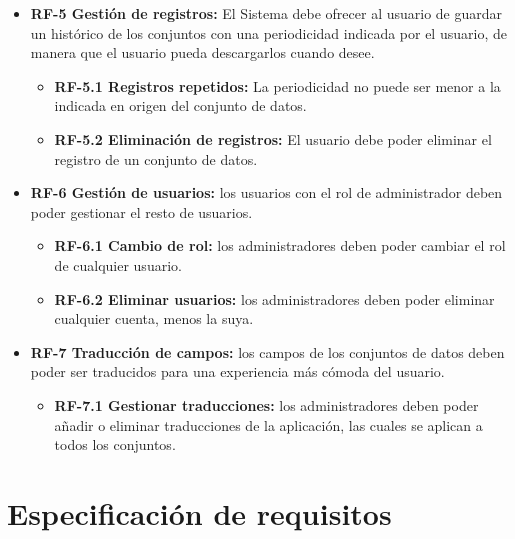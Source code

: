 \begin{itemize}
    \item \textbf{RF-5 Gestión de registros:} El Sistema debe ofrecer al usuario de guardar un histórico de los conjuntos con una periodicidad indicada por el usuario, de manera que el usuario pueda descargarlos cuando desee.
    \begin{itemize}
        \item \textbf{RF-5.1 Registros repetidos:} La periodicidad no puede ser menor a la indicada en origen del conjunto de datos.
        \item \textbf{RF-5.2 Eliminación de registros:} El usuario debe poder eliminar el registro de un conjunto de datos.
    \end{itemize}

    \item \textbf{RF-6 Gestión de usuarios:} los usuarios con el rol de administrador deben poder gestionar el resto de usuarios.
    \begin{itemize}
        \item \textbf{RF-6.1 Cambio de rol:} los administradores deben poder cambiar el rol de cualquier usuario.
        \item \textbf{RF-6.2 Eliminar usuarios:} los administradores deben poder eliminar cualquier cuenta, menos la suya.
    \end{itemize}

    \item \textbf{RF-7 Traducción de campos:} los campos de los conjuntos de datos deben poder ser traducidos para una experiencia más cómoda del usuario.
    \begin{itemize}
        \item \textbf{RF-7.1 Gestionar traducciones:} los administradores deben poder añadir o eliminar traducciones de la aplicación, las cuales se aplican a todos los conjuntos.
    \end{itemize}
    
\end{itemize}


\section{Especificación de requisitos}


